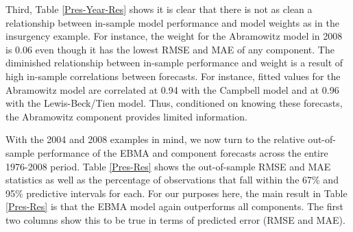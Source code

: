 \documentclass[pdftex,12pt,fullpage,oneside]{amsart}
\begin{document}
Third, Table \ref{Pres-Year-Res} shows it is clear that there is not
as clean a relationship between in-sample model performance and model
weights as in the insurgency example.  For instance, the weight for
the Abramowitz model in 2008 is 0.06 even though it has the lowest
RMSE and MAE of any component.  The diminished relationship between
in-sample performance and weight is a result of high in-sample
correlations between forecasts.  For instance, fitted values for the
Abramowitz model are correlated at 0.94 with the Campbell model and at
0.96 with the Lewis-Beck/Tien model. Thus, conditioned on knowing
these forecasts, the Abramowitz component provides limited
information.




With the 2004 and 2008 examples in mind, we now turn to the relative
out-of-sample performance of the EBMA and component forecasts across
the entire 1976-2008 period.  Table \ref{Pres-Res} shows the
out-of-sample RMSE and
MAE statistics as well as the percentage of observations that fall
within the 67\% and 95\% predictive intervals for each.  For our
purposes here, the main result in Table \ref{Pres-Res} is that the
EBMA model again outperforms all components.  The first two columns
show this to be true in terms of predicted error (RMSE and MAE).
\end{document}
